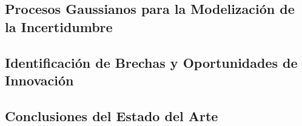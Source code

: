 \subsection{Procesos Gaussianos para la Modelización de la Incertidumbre}

\subsection{Identificación de Brechas y Oportunidades de Innovación}

\subsection{Conclusiones del Estado del Arte}
